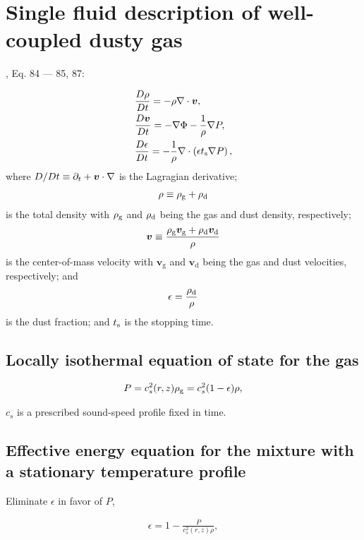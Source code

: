 \section{Single fluid description of well-coupled dusty gas}\label{setup} 

\cite{laibe14}, Eq. 84 --- 85, 87: 

\begin{align}
  &\frac{D\rho}{Dt} = -\rho\nabla\cdot\bm{v}, \label{masseq}\\ 
  &\frac{D\bm{v}}{Dt} = - \nabla\Phi - \frac{1}{\rho}\nabla
  P, \label{momeq}\\ 
  &\frac{D\epsilon}{Dt} = -\frac{1}{\rho} \nabla \cdot \left(\epsilon 
  t_\mathrm{s} \nabla P \right),\label{dusteq}  
\end{align}
where $D/Dt \equiv \partial_t + \bm{v}\cdot\nabla$ is the Lagragian
derivative; 
\begin{align}
  \rho \equiv \rho_\mathrm{g} + \rho_\mathrm{d}
\end{align}
is the total density with $\rho_\mathrm{g}$ and $\rho_\mathrm{d}$ being the gas and dust
density, respectively; 
\begin{align}
  \bm{v} \equiv \frac{\rho_\mathrm{g}\bm{v}_\mathrm{g} +
    \rho_\mathrm{d}\bm{v}_\mathrm{d}}{\rho}
\end{align}
is the center-of-mass velocity with $\bm{v}_\mathrm{g}$ and
$\bm{v}_\mathrm{d}$ being the gas and dust velocities, respectively; 
and 
\begin{align}
  \epsilon = \frac{\rho_\mathrm{d}}{\rho} 
\end{align}
is the dust fraction; and $t_\mathrm{s}$ is the stopping time. 

\subsection{Locally isothermal equation of state for the gas} 

\begin{align}\label{eos}
  P = c_s^2(r,z)\rho_\mathrm{g} = c_s^{2}(1 - \epsilon)\rho,   
\end{align}

$c_s$ is a prescribed sound-speed profile fixed in time. 

\subsection{Effective energy equation for the mixture with a
  stationary temperature profile}   
Eliminate $\epsilon$ in favor of $P$,

\begin{align}
  \epsilon = 1 - \frac{P}{c_s^2(r,z)\rho}, 
\end{align}

